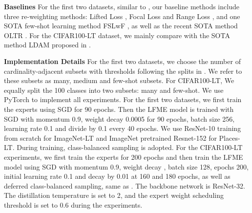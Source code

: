 \documentclass[runningheads]{llncs}
\begin{document}
	\noindent\textbf{Baselines} \quad
	For the first two datasets, similar to \cite{liu2019large}, our baseline methods include three re-weighting methods: Lifted Loss \cite{oh2016deep}, Focal Loss \cite{lin2017focal} and Range Loss \cite{zhang2017range}, and one SOTA few-shot learning method FSLwF \cite{gidaris2018dynamic}, as well as the recent SOTA method OLTR \cite{liu2019large}. For the CIFAR100-LT dataset, we mainly compare with the SOTA method LDAM proposed in \cite{cao2019learning}.
	
	
	\noindent\textbf{Implementation Details} \quad
	For the first two datasets, we choose the number of cardinality-adjacent subsets  with thresholds  following the splits in \cite{liu2019large}. We refer to these subsets as many, medium and few-shot subsets. For CIFAR100-LT, We equally split the 100 classes into two subsets: many and few-shot.
We use PyTorch \cite{paszke2017automatic} to implement all experiments. For the first two datasets, we first train the experts using SGD for 90 epochs. Then the LFME model is trained with SGD with momentum 0.9, weight decay 0.0005 for 90 epochs, batch size 256, learning rate 0.1 and divide by 0.1 every 40 epochs. We use ResNet-10 \cite{he2016deep} training from scratch for ImageNet-LT and ImageNet pretrained Resnet-152 for Places-LT. During training, class-balanced sampling is adopted. For the CIFAR100-LT experiments, we first train the experts for 200 epochs and then train the LFME model using SGD with momentum 0.9, weight decay , batch size 128, epochs 200, initial learning rate 0.1 and decay by 0.01 at 160 and 180 epochs, as well as deferred class-balanced sampling, same as \cite{cao2019learning}. The backbone network is ResNet-32.
The distillation temperature  is set to 2, and the expert weight scheduling threshold  is set to 0.6 during the experiments.  
	
\end{document}
